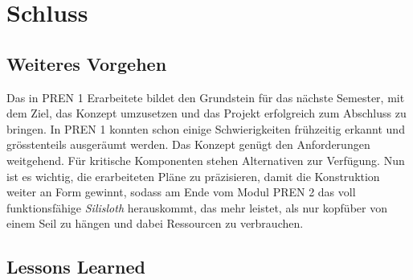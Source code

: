\section{Schluss}
\label{sec:schlusswort}

\subsection{Weiteres Vorgehen}

Das in PREN 1 Erarbeitete bildet den Grundstein für das nächste Semester, mit dem Ziel, das Konzept umzusetzen und das Projekt erfolgreich zum Abschluss zu bringen. In PREN 1 konnten schon einige Schwierigkeiten frühzeitig erkannt und grösstenteils ausgeräumt werden. Das Konzept genügt den Anforderungen weitgehend. Für kritische Komponenten stehen Alternativen zur Verfügung. Nun ist es wichtig, die erarbeiteten Pläne zu präzisieren, damit die Konstruktion weiter an Form gewinnt, sodass am Ende vom Modul PREN 2 das voll funktionsfähige \textit{Silisloth} herauskommt, das mehr leistet, als nur kopfüber von einem Seil zu hängen und dabei Ressourcen zu verbrauchen.

\subsection{Lessons Learned}


